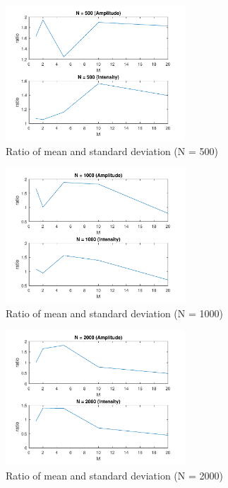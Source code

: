 \documentclass{article}
\begin{document}
\begin{figure}[H]
	\centering
	\includegraphics[width = 0.6\textwidth]{src/2pi/ratio_500.pdf}
	\caption{Ratio of mean and standard deviation (N = 500)}
	\label{fig:ratio-500}
\end{figure}
\begin{figure}[H]
	\centering
	\includegraphics[width = 0.6\textwidth]{src/2pi/ratio_1000.pdf}
	\caption{Ratio of mean and standard deviation (N = 1000)}
	\label{fig:ratio-1000}
\end{figure}
\begin{figure}[H]
	\centering
	\includegraphics[width = 0.6\textwidth]{src/2pi/ratio_2000.pdf}
	\caption{Ratio of mean and standard deviation (N = 2000)}
	\label{fig:ratio-2000}
\end{figure}
\end{document}
